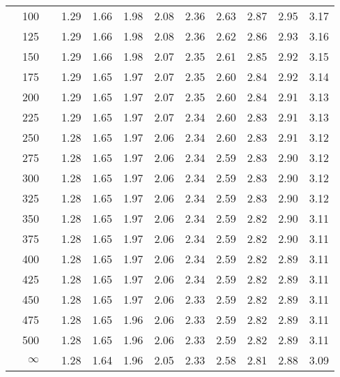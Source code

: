 \documentclass[12pt,letterpaper]{article}
\begin{document}
\begin{center}
\begin{tabular}{|l r | l c c c c c c c c c|}
&100&& 1.29 & 1.66 & 1.98 & 2.08 & 2.36 & 2.63 & 2.87 & 2.95 & 3.17\\ 
&125&& 1.29 & 1.66 & 1.98 & 2.08 & 2.36 & 2.62 & 2.86 & 2.93 & 3.16\\ 
&150&& 1.29 & 1.66 & 1.98 & 2.07 & 2.35 & 2.61 & 2.85 & 2.92 & 3.15\\ 
&175&& 1.29 & 1.65 & 1.97 & 2.07 & 2.35 & 2.60 & 2.84 & 2.92 & 3.14\\ 
&200&& 1.29 & 1.65 & 1.97 & 2.07 & 2.35 & 2.60 & 2.84 & 2.91 & 3.13\\ 
&225&& 1.29 & 1.65 & 1.97 & 2.07 & 2.34 & 2.60 & 2.83 & 2.91 & 3.13\\ 
&250&& 1.28 & 1.65 & 1.97 & 2.06 & 2.34 & 2.60 & 2.83 & 2.91 & 3.12\\ 
&275&& 1.28 & 1.65 & 1.97 & 2.06 & 2.34 & 2.59 & 2.83 & 2.90 & 3.12\\ 
&300&& 1.28 & 1.65 & 1.97 & 2.06 & 2.34 & 2.59 & 2.83 & 2.90 & 3.12\\ 
&325&& 1.28 & 1.65 & 1.97 & 2.06 & 2.34 & 2.59 & 2.83 & 2.90 & 3.12\\ 
&350&& 1.28 & 1.65 & 1.97 & 2.06 & 2.34 & 2.59 & 2.82 & 2.90 & 3.11\\ 
&375&& 1.28 & 1.65 & 1.97 & 2.06 & 2.34 & 2.59 & 2.82 & 2.90 & 3.11\\ 
&400&& 1.28 & 1.65 & 1.97 & 2.06 & 2.34 & 2.59 & 2.82 & 2.89 & 3.11\\ 
&425&& 1.28 & 1.65 & 1.97 & 2.06 & 2.34 & 2.59 & 2.82 & 2.89 & 3.11\\ 
&450&& 1.28 & 1.65 & 1.97 & 2.06 & 2.33 & 2.59 & 2.82 & 2.89 & 3.11\\ 
&475&& 1.28 & 1.65 & 1.96 & 2.06 & 2.33 & 2.59 & 2.82 & 2.89 & 3.11\\ 
&500&& 1.28 & 1.65 & 1.96 & 2.06 & 2.33 & 2.59 & 2.82 & 2.89 & 3.11\\ 
&$\infty$&& 1.28 & 1.64 & 1.96 & 2.05 & 2.33 & 2.58 & 2.81 & 2.88 & 3.09\\ \hline
\end{tabular}
\end{center}





\end{document}
